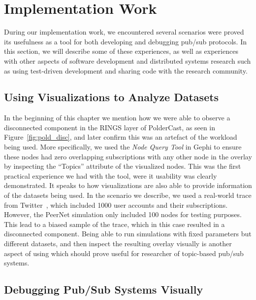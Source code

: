 \section{Implementation Work}

During our implementation work, we encountered several scenarios were
\demo proved its usefulness as a tool for both developing and debugging
pub/sub protocols. In this section, we will describe some of these
experiences, as well as experiences with other aspects of software
development and distributed systems research such as using test-driven
development and sharing code with the research community.

\subsection{Using Visualizations to Analyze Datasets}

In the beginning of this chapter we mention how we were able to observe a
disconnected component in the RINGS layer of PolderCast, as seen in
Figure~\ref{fig:pold_disc}, and later confirm this was an artefact of
the workload being used. More specifically, we used the \emph{Node Query
    Tool} in Gephi to ensure these nodes had zero overlapping
subscriptions with any other node in the overlay by inspecting the
``Topics'' attribute of the visualized nodes. This was the first
practical experience we had with the tool, were it usability was clearly
demonstrated. It speaks to how visualizations are also able to provide
information of the datasets being used. In the scenario we describe, we
used a real-world trace from Twitter~\cite{Kwak10www}, which included
1000 user accounts and their subscriptions. However, the PeerNet
simulation only included 100 nodes for testing purposes. This lead to a
biased sample of the trace, which in this case resulted in a
disconnected component. Being able to run simulations with fixed
parameters but different datasets, and then inspect the resulting
overlay visually is another aspect of using \demo which should prove
useful for researcher of topic-based pub/sub systems.

\subsection{Debugging Pub/Sub Systems Visually}

